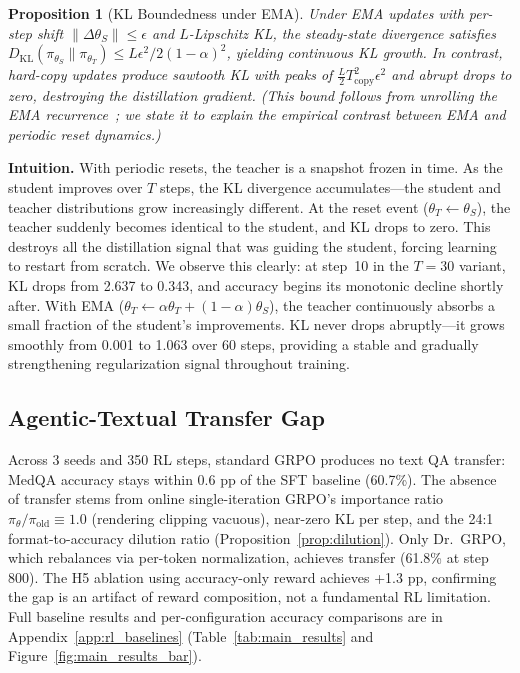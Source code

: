 \documentclass{article}
\newtheorem{proposition}{Proposition}[section]
\begin{document}
\begin{proposition}[KL Boundedness under EMA]
\label{prop:kl_bound}
Under EMA updates with per-step shift $\|\Delta\theta_S\| \leq \epsilon$ and $L$-Lipschitz KL, the steady-state divergence satisfies $D_{\mathrm{KL}}(\pi_{\theta_S} \| \pi_{\theta_T}) \leq L\epsilon^2 / 2(1-\alpha)^2$, yielding continuous KL growth. In contrast, hard-copy updates produce sawtooth KL with peaks of $\frac{L}{2}T_\text{copy}^2\epsilon^2$ and abrupt drops to zero, destroying the distillation gradient. (This bound follows from unrolling the EMA recurrence~\citep{polyak1992acceleration}; we state it to explain the empirical contrast between EMA and periodic reset dynamics.)
\end{proposition}

\noindent\textbf{Intuition.} With periodic resets, the teacher is a snapshot frozen in time. As the student improves over $T$ steps, the KL divergence accumulates---the student and teacher distributions grow increasingly different. At the reset event ($\theta_T \leftarrow \theta_S$), the teacher suddenly becomes identical to the student, and KL drops to zero. This destroys all the distillation signal that was guiding the student, forcing learning to restart from scratch. We observe this clearly: at step~10 in the $T{=}30$ variant, KL drops from 2.637 to 0.343, and accuracy begins its monotonic decline shortly after. With EMA ($\theta_T \leftarrow \alpha\theta_T + (1{-}\alpha)\theta_S$), the teacher continuously absorbs a small fraction of the student's improvements. KL never drops abruptly---it grows smoothly from 0.001 to 1.063 over 60 steps, providing a stable and gradually strengthening regularization signal throughout training.


\subsection{Agentic-Textual Transfer Gap}
\label{sec:transfer}

Across 3 seeds and 350 RL steps, standard GRPO produces no text QA transfer: MedQA accuracy stays within 0.6 pp of the SFT baseline (60.7\%). The absence of transfer stems from online single-iteration GRPO's importance ratio $\pi_\theta/\pi_\text{old} \equiv 1.0$ (rendering clipping vacuous), near-zero KL per step, and the 24:1 format-to-accuracy dilution ratio (Proposition~\ref{prop:dilution}). Only Dr.~GRPO, which rebalances via per-token normalization, achieves transfer (61.8\% at step 800). The H5 ablation using accuracy-only reward achieves +1.3 pp, confirming the gap is an artifact of reward composition, not a fundamental RL limitation. Full baseline results and per-configuration accuracy comparisons are in Appendix~\ref{app:rl_baselines} (Table~\ref{tab:main_results} and Figure~\ref{fig:main_results_bar}).
\end{document}
